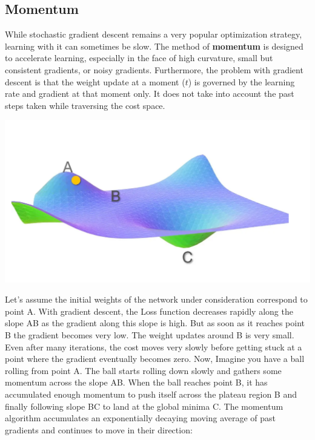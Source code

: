\subsection{Momentum}
While stochastic gradient descent remains a very popular optimization strategy, learning with it can sometimes be slow. The method of \textbf{momentum} is designed to accelerate learning, especially in the face of high curvature, small but consistent gradients, or noisy gradients. Furthermore, the problem with gradient descent is that the weight update at a moment ($t$) is governed by the learning rate and gradient at that moment only. It does not take into account the past steps taken while traversing the cost space.
\begin{center}
    \includegraphics[scale=0.7]{images/momentum.png}
\end{center}
Let’s assume the initial weights of the network under consideration correspond to point A. With gradient descent, the Loss function decreases rapidly along the slope AB as the gradient along this slope is high. But as soon as it reaches point B the gradient becomes very low. The weight updates around B is very small. Even after many iterations, the cost moves very slowly before getting stuck at a point where the gradient eventually becomes zero.\newline\newline
Now, Imagine you have a ball rolling from point A. The ball starts rolling down slowly and gathers some momentum across the slope AB. When the ball reaches point B, it has accumulated enough momentum to push itself across the plateau region B and finally following slope BC to land at the global minima C.\newline\newline
The momentum algorithm accumulates an exponentially decaying moving average of past gradients and continues to move in their direction:

